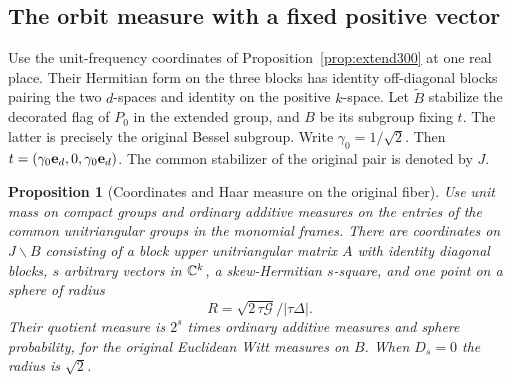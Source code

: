 \documentclass[a4paper,11pt]{article}
\newtheorem{proposition}{Proposition}[section]
\theoremstyle{definition}
\theoremstyle{remark}
\numberwithin{equation}{section}
\begin{document}
\subsection{The orbit measure with a fixed positive vector}\label{nav:VIII-57}
Use the unit-frequency coordinates of Proposition~\ref{prop:extend300}
at one real place. Their Hermitian form on the three blocks
has identity off-diagonal blocks pairing the two \(d\)-spaces
and identity on the positive \(k\)-space. Let \(\widetilde B\)
stabilize the decorated flag of \(P_0\) in the extended group,
and \(B\) be its subgroup fixing \(t\). The latter is precisely
the original Bessel subgroup. Write \(\gamma_0=1/\sqrt2\).
Then \(t=(\gamma_0{\bf e}_d,0,\gamma_0{\bf e}_d)\).
The common stabilizer of the original pair is denoted by \(J\).

\begin{proposition}[Coordinates and Haar measure on the original fiber]\leavevmode
\label{prop:slice300}
Use unit mass on compact groups and ordinary additive measures
on the entries of the common unitriangular groups in the
monomial frames. There are coordinates on \(J\backslash B\)
consisting of a block upper unitriangular matrix \(A\) with
identity diagonal blocks, \(s\) arbitrary vectors in \(\mathbb C^k\),
a skew-Hermitian \(s\)-square, and one point on a sphere of
radius
\[
                R=\sqrt{2\,\tau\mathcal G}/|\tau\Delta| .
\]
Their quotient measure is \(2^s\) times ordinary additive
measures and sphere probability, for the original Euclidean
Witt measures on \(B\). When \(D_s=0\) the radius is \(\sqrt2\).
\end{proposition}
\end{document}
